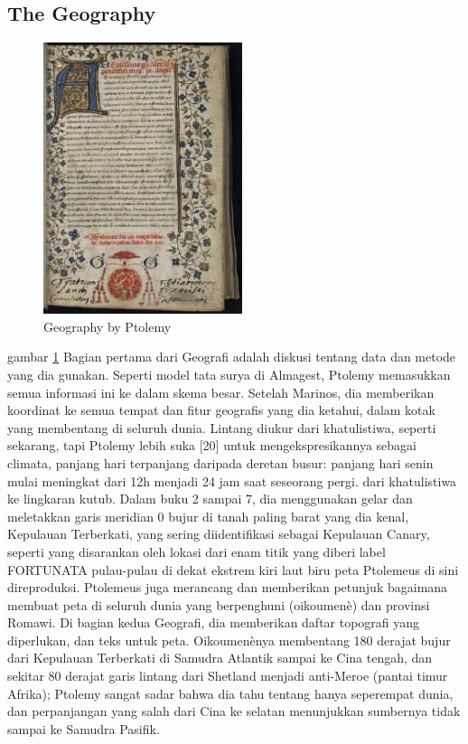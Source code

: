   \subsection{The Geography}	
   \begin{figure} [ht]
	\centerline{\includegraphics[width=.5\textwidth]{figures/geography}}
	\caption{Geography by Ptolemy}
	\label{geography}
		\end{figure}
    gambar \ref {geography} Bagian pertama dari Geografi adalah diskusi tentang data dan metode yang dia gunakan. Seperti model tata surya di Almagest, Ptolemy memasukkan semua informasi ini ke dalam skema besar. Setelah Marinos, dia memberikan koordinat ke semua tempat dan fitur geografis yang dia ketahui, dalam kotak yang membentang di seluruh dunia. Lintang diukur dari khatulistiwa, seperti sekarang, tapi Ptolemy lebih suka [20] untuk mengekspresikannya sebagai climata, panjang hari terpanjang daripada deretan busur: panjang hari senin mulai meningkat dari 12h menjadi 24 jam saat seseorang pergi. dari khatulistiwa ke lingkaran kutub. Dalam buku 2 sampai 7, dia menggunakan gelar dan meletakkan garis meridian 0 bujur di tanah paling barat yang dia kenal, Kepulauan Terberkati, yang sering diidentifikasi sebagai Kepulauan Canary, seperti yang disarankan oleh lokasi dari enam titik yang diberi label FORTUNATA pulau-pulau di dekat ekstrem kiri laut biru peta Ptolemeus di sini direproduksi.
	Ptolemeus juga merancang dan memberikan petunjuk bagaimana membuat peta di seluruh dunia yang berpenghuni (oikoumenè) dan provinsi Romawi. Di bagian kedua Geografi, dia memberikan daftar topografi yang diperlukan, dan teks untuk peta. Oikoumenènya membentang 180 derajat bujur dari Kepulauan Terberkati di Samudra Atlantik sampai ke Cina tengah, dan sekitar 80 derajat garis lintang dari Shetland menjadi anti-Meroe (pantai timur Afrika); Ptolemy sangat sadar bahwa dia tahu tentang hanya seperempat dunia, dan perpanjangan yang salah dari Cina ke selatan menunjukkan sumbernya tidak sampai ke Samudra Pasifik.
